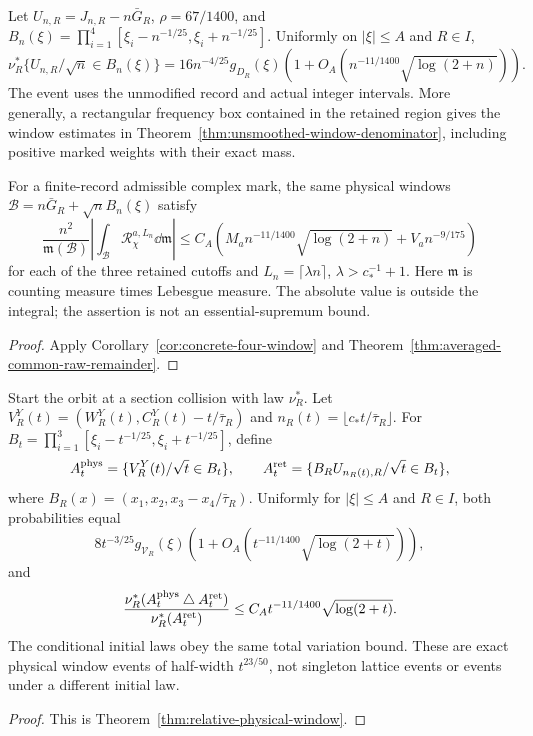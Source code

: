 \begin{maintheorem}
\label{thm:intro-window-remainder}
Let $U_{n,R}=J_{n,R}-n\bar G_R$, $\rho=67/1400$, and
$B_n(\xi)=\prod_{i=1}^4[\xi_i-n^{-1/25},\xi_i+n^{-1/25}]$.
Uniformly on $|\xi|\le A$ and $R\in I$,
\[
 \nu_R^*\{U_{n,R}/\sqrt n\in B_n(\xi)\}
 =16n^{-4/25}g_{D_R}(\xi)
       \left(1+O_A(n^{-11/1400}\sqrt{\log(2+n)})\right).
\]
The event uses the unmodified record and actual integer intervals.
More generally, a rectangular frequency box contained in the retained
region gives the window estimates in
Theorem~\ref{thm:unsmoothed-window-denominator}, including positive
marked weights with their exact mass.

For a finite-record admissible complex mark, the same physical windows
$\mathcal B=n\bar G_R+\sqrt nB_n(\xi)$ satisfy
\[
 \frac{n^2}{\mathfrak m(\mathcal B)}
 \left|\int_{\mathcal B}\mathcal R_\chi^{a,L_n}\dd\mathfrak m\right|
 \le C_A\left(M_an^{-11/1400}\sqrt{\log(2+n)}+V_an^{-9/175}\right)
\]
for each of the three retained cutoffs and $L_n=\lceil\lambda n\rceil$,
$\lambda>c_*^{-1}+1$. Here $\mathfrak m$ is counting measure times
Lebesgue measure. The absolute value is outside the integral; the
assertion is not an essential-supremum bound.
\end{maintheorem}
\begin{proof}
Apply Corollary~\ref{cor:concrete-four-window} and
Theorem~\ref{thm:averaged-common-raw-remainder}.
\end{proof}

\begin{maintheorem}
\label{thm:intro-relative-physical-window}
Start the orbit at a section collision with law $\nu_R^*$. Let
$V_R^Y(t)=(W_R^Y(t),C_R^Y(t)-t/\bar\tau_R)$ and
$n_R(t)=\lfloor c_*t/\bar\tau_R\rfloor$.
For $B_t=\prod_{i=1}^3[\xi_i-t^{-1/25},\xi_i+t^{-1/25}]$, define
\[
 A_t^{\rm phys}=\{V_R^Y(t)/\sqrt t\in B_t\},\qquad
 A_t^{\rm ret}=\{B_RU_{n_R(t),R}/\sqrt t\in B_t\},
\]
where $B_R(x)=(x_1,x_2,x_3-x_4/\bar\tau_R)$.
Uniformly for $|\xi|\le A$ and $R\in I$, both probabilities equal
\[
 8t^{-3/25}g_{\mathcal V_R}(\xi)
       \left(1+O_A(t^{-11/1400}\sqrt{\log(2+t)})\right),
\]
and
\[
 \frac{\nu_R^*(A_t^{\rm phys}\mathbin\triangle A_t^{\rm ret})}
      {\nu_R^*(A_t^{\rm ret})}
       \le C_A t^{-11/1400}\sqrt{\log(2+t)}.
\]
The conditional initial laws obey the same total variation bound.
These are exact physical window events of half-width $t^{23/50}$,
not singleton lattice events or events under a different initial law.
\end{maintheorem}
\begin{proof}
This is Theorem~\ref{thm:relative-physical-window}.
\end{proof}


